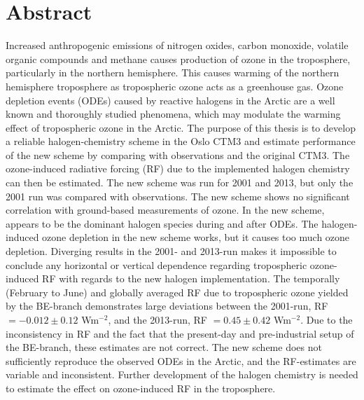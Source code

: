 \chapter*{Abstract}



Increased anthropogenic emissions of nitrogen oxides, carbon monoxide, volatile organic compounds and methane causes production of ozone in the troposphere, particularly in the northern hemisphere. This causes warming of the northern hemisphere troposphere as tropospheric ozone acts as a greenhouse gas. Ozone depletion events (ODEs) caused by reactive halogens in the Arctic are a well known and thoroughly studied phenomena, which may modulate the warming effect of tropospheric ozone in the Arctic. The purpose of this thesis is to develop a reliable halogen-chemistry scheme in the Oslo CTM3 and estimate performance of the new scheme by comparing with observations and the original CTM3. The ozone-induced radiative forcing (RF) due to the implemented halogen chemistry can then be estimated. The new scheme was run for 2001 and 2013, but only the 2001 run was compared with observations. The new scheme shows no significant correlation with ground-based measurements of ozone. In the new scheme,  appears to be the dominant halogen species during and after ODEs. The halogen-induced ozone depletion in the new scheme works, but it causes too much ozone depletion. Diverging results in the 2001- and 2013-run makes it impossible to conclude any horizontal or vertical dependence regarding tropospheric ozone-induced RF with regards to the new halogen implementation. The temporally (February to June) and globally averaged RF due to tropospheric ozone yielded by the BE-branch demonstrates large deviations between the 2001-run, RF $=-0.012\pm0.12$ Wm$^{-2}$, and the 2013-run, RF $= 0.45\pm0.42$ Wm$^{-2}$. Due to the inconsistency in RF and the fact that the present-day and pre-industrial setup of the BE-branch, these estimates are not correct. The new scheme does not sufficiently reproduce the observed ODEs in the Arctic, and the RF-estimates are variable and inconsistent. Further development of the halogen chemistry is needed to estimate the effect on ozone-induced RF in the troposphere. 
\cleardoublepage

